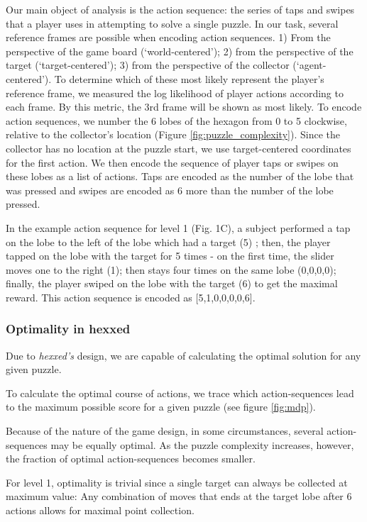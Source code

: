 \documentclass[11pt]{article}
\begin{document}
Our main object of analysis is the action sequence: the series of taps and swipes that a player uses in attempting to solve a single puzzle. In our task, several reference frames are possible when encoding action sequences. 1) From the perspective of the game board (‘world-centered’); 2) from the perspective of the target (‘target-centered’); 3) from the perspective of the collector (‘agent-centered’). To determine which of these most likely represent the player’s reference frame, we measured the log likelihood of player actions according to each frame. By this metric, the 3rd frame will be shown as most likely.
To encode action sequences, we number the 6 lobes of the hexagon from 0 to 5 clockwise, relative to the collector’s location (Figure \ref{fig:puzzle_complexity}).  Since the collector has no location at the puzzle start, we use target-centered coordinates for the first action. We then encode the sequence of player taps or swipes on these lobes as a list of actions. Taps are encoded as the number of the lobe that was pressed and swipes are encoded as 6 more than the number of the lobe pressed.

In the example action sequence for level 1 (Fig. 1C), a subject performed a tap on the lobe to the left of the lobe which had a target (5) ; then, the player tapped on the lobe with the target for 5 times - on the first time, the slider moves one to the right (1); then stays four times on the same lobe (0,0,0,0); finally, the player swiped on the lobe with the target (6) to get the maximal reward. This action sequence is encoded as [5,1,0,0,0,0,6].


\subsubsection{Optimality in hexxed}
Due to \textit{hexxed's} design, we are capable of calculating the optimal solution for any given puzzle.

To calculate the optimal course of actions, we trace which action-sequences lead to the maximum possible score for a given puzzle (see figure \ref{fig:mdp}).

Because of the nature of the game design, in some circumstances, several action-sequences may be equally optimal. As the puzzle complexity increases, however, the fraction of optimal action-sequences becomes smaller.

For level 1, optimality is trivial since a single target can always be collected at maximum value: Any combination of moves that ends at the target lobe after 6 actions allows for maximal point collection.
\end{document}
